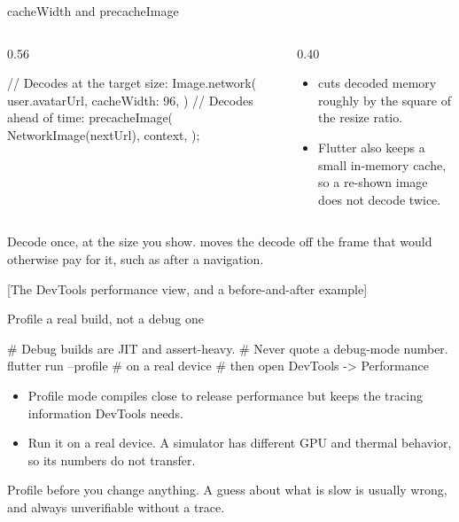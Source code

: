 \documentclass[10pt,aspectratio=169,t]{beamer}
\begin{document}
\begin{frame}[fragile,eyebrow=Optimization]{cacheWidth and precacheImage}
  \begin{columns}[T]
    \begin{column}{0.56\textwidth}
\begin{dart}
// Decodes at the target size:
Image.network(
  user.avatarUrl, cacheWidth: 96,
)
// Decodes ahead of time:
precacheImage(
  NetworkImage(nextUrl), context,
);
\end{dart}
    \end{column}
    \begin{column}{0.40\textwidth}
      \begin{itemize}
        \item {} cuts decoded memory roughly by the square of the resize ratio.
        \item Flutter also keeps a small in-memory cache, so a re-shown image does not decode twice.
      \end{itemize}
    \end{column}
  \end{columns}
  \begin{takeaway}{Decode once, at the size you show.}
     moves the decode off the frame that would otherwise pay for it, such as after a navigation.
  \end{takeaway}
\end{frame}

[The DevTools performance view, and a before-and-after example]

\begin{frame}[fragile,eyebrow=Profiling]{Profile a real build, not a debug one}
\begin{shell}
# Debug builds are JIT and assert-heavy.
# Never quote a debug-mode number.
flutter run --profile        # on a real device
# then open DevTools -> Performance
\end{shell}
  \begin{itemize}
    \item Profile mode compiles close to release performance but keeps the tracing information DevTools needs.
    \item Run it on a real device. A simulator has different GPU and thermal behavior, so its numbers do not transfer.
  \end{itemize}
  \begin{takeaway}{Profile before you change anything.}
    A guess about what is slow is usually wrong, and always unverifiable without a trace.
  \end{takeaway}
\end{frame}
\end{document}
